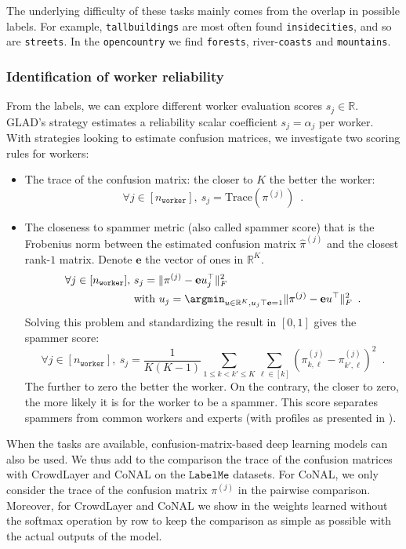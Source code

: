 The underlying difficulty of these tasks mainly comes from the overlap in possible labels. For example, \texttt{tallbuildings} are most often found \texttt{insidecities}, and so are \texttt{streets}. In the \texttt{opencountry} we find \texttt{forests}, river-\texttt{coasts} and \texttt{mountains}.

\subsubsection{Identification of worker reliability}

From the labels, we can explore different worker evaluation scores $s_j\in\mathbb{R}$.
GLAD's strategy estimates a reliability scalar coefficient $s_j=\alpha_j$ per worker.
With strategies looking to estimate confusion matrices, we investigate two scoring rules for workers:
\begin{itemize}
    \item The trace of the confusion matrix: the closer to $K$ the better the worker:
        \[
            \forall j\in [n_\texttt{worker}],\ s_j=\mathrm{Trace}(\pi^{(j)}) \enspace.
        \]
    \item The closeness to spammer metric \citep{raykar_ranking_2011} (also called spammer score) that is the Frobenius norm between the estimated confusion matrix $\hat{\pi}^{(j)}$ and the closest rank-$1$ matrix. Denote $\mathbf{e}$ the vector of ones in $\mathbb{R}^K$.
    \[
        \begin{aligned}
        \forall j\in [n_\texttt{worker}],\ &s_j = \|\pi^{(j)}- \mathbf{e}u_j^\top\|_F^2\enspace \\
        & \text{with } u_j = \argmin_{u\in\mathbb{R}^K, u_j\top \mathbf{e}=1} \|\pi^{(j)}- \mathbf{e}u^\top\|_F^2 \enspace.
        \end{aligned}
        \]
    Solving this problem and standardizing the result in $[0,1]$ gives the spammer score:
    \[
    \forall j \in [n_\texttt{worker}],\ s_j = \frac{1}{K(K-1)}\sum_{1\leq k<k'\leq K}\sum_{\ell\in[k]} (\pi^{(j)}_{k,\ell} - \pi^{(j)}_{k',\ell})^2 \enspace.
    \]
    The further to zero the better the worker. On the contrary, the closer to zero, the more likely it is for the worker to be a spammer. This score separates spammers from common workers and experts (with profiles as presented in ).
\end{itemize}

When the tasks are available, confusion-matrix-based deep learning models can also be used.
We thus add to the comparison the trace of the confusion matrices with CrowdLayer and CoNAL on the $\texttt{LabelMe}$ datasets.
For CoNAL, we only consider the trace of the confusion matrix $\pi^{(j)}$ in the pairwise comparison.
Moreover, for CrowdLayer and CoNAL we show in  the weights learned without the softmax operation by row to keep the comparison as simple as possible with the actual outputs of the model.

